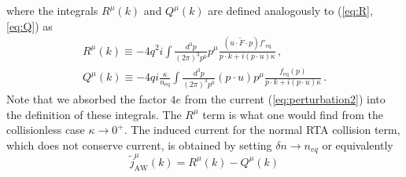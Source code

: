 where the integrals $R^\mu(k)$ and $Q^\mu(k)$ are defined analogously to (\ref{eq:R},\ref{eq:Q}) as
\begin{align}
\label{eq:Rmu}R^\mu(k)  \equiv -4q^2i \int \frac{d^3p}{(2\pi)^3p^0} p^\mu \frac{(u \cdot \widetilde{F} \cdot p)f'_\mathrm{eq}}{p \cdot k + i (p \cdot u)\kappa}\,,\\
\label{eq:Qmu}Q^\mu(k) \equiv -4qi \frac{\kappa}{n_\mathrm{eq}}\int \frac{d^3p}{(2\pi)^3p^0}(p\cdot u) p^\mu \frac{f_\mathrm{eq}(p)}{p\cdot k + i(p \cdot u)\kappa}\,.
\end{align} 
Note that we absorbed the factor $4e$ from the current (\ref{eq:perturbation2}) into the definition of these integrals. The $R^{\mu}$ term is what one would find from the collisionless case $\kappa \rightarrow 0^+$. The induced current for the normal RTA collision term, which does not conserve current, is obtained by setting $\delta n \rightarrow n_{eq}$ or equivalently
\begin{equation}\label{eq:jRTA}
\widetilde{j}_{\mathrm{AW}}^\mu(k) = R^\mu(k) - Q^\mu(k)
\end{equation}



